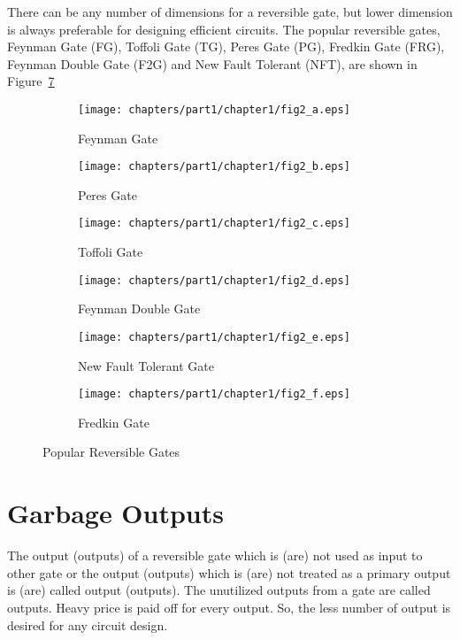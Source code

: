 \begin{example}\textnormal{
There can be any number of dimensions for a reversible gate, but lower dimension is always preferable for designing efficient circuits. The popular reversible gates, Feynman Gate (FG), Toffoli Gate (TG), Peres Gate (PG), Fredkin Gate (FRG), Feynman Double Gate (F2G) and New Fault Tolerant (NFT), are shown in Figure~\ref{fig:p1_c1_fig2}}
\end{example}
\begin{figure}[H]
\centering
\begin{subfigure}[b]{0.30\textwidth}
\centering
\texttt{[image: chapters/part1/chapter1/fig2\_a.eps]}
\caption{Feynman Gate}
\label{fig:p1_c1_fig2_a}
\end{subfigure}
\begin{subfigure}[b]{0.30\textwidth}
\centering
\texttt{[image: chapters/part1/chapter1/fig2\_b.eps]}
\caption{Peres Gate}
\label{fig:p2_c1_fig2_b}
\end{subfigure}
\begin{subfigure}[b]{0.30\textwidth}
\centering
\texttt{[image: chapters/part1/chapter1/fig2\_c.eps]}
\caption{Toffoli Gate}
\label{fig:p1_c1_fig2_c}
\end{subfigure}

\begin{subfigure}[b]{0.30\textwidth}
\centering
\texttt{[image: chapters/part1/chapter1/fig2\_d.eps]}
\caption{Feynman Double Gate}
\label{fig:p1_c1_fig2_d}
\end{subfigure}
\begin{subfigure}[b]{0.30\textwidth}
\centering
\texttt{[image: chapters/part1/chapter1/fig2\_e.eps]}
\caption{New Fault Tolerant Gate}
\label{fig:p1_c1_fig2_e}
\end{subfigure}
\begin{subfigure}[b]{0.30\textwidth}
\centering
\texttt{[image: chapters/part1/chapter1/fig2\_f.eps]}
\caption{Fredkin Gate}
\label{fig:p1_c1_fig2_f}
\end{subfigure}
\caption{Popular Reversible Gates}
\label{fig:p1_c1_fig2}
\end{figure}

\section{Garbage Outputs}

The output (outputs) of a reversible gate which is (are) not used as input to other gate or the output (outputs) which is (are) not treated as a primary output is (are) called  output (outputs). The unutilized outputs
from a gate are called  outputs. Heavy price is paid
oﬀ for every  output. So, the less number of  output is desired for any circuit design.


